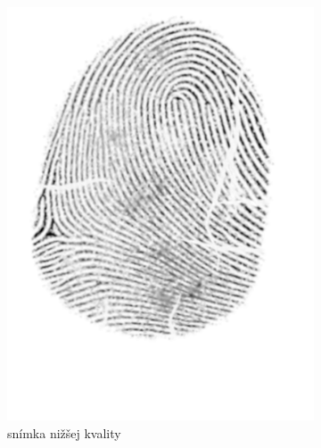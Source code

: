 \begin{figure}[h]
\begin{subfigure}[b]{0.3\linewidth}
      \includegraphics[width=\linewidth]{obrazky-figures/ecsema_orig.png}
      \caption{snímka nižšej kvality}
      \label{obr:ecsema_orig}
    \end{subfigure}
    \hfill
    \begin{subfigure}[b]{0.3\linewidth}

\end{subfigure}
\end{figure}
